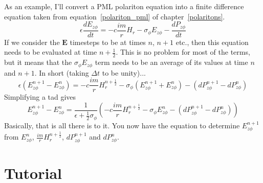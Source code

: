 \documentclass[floats]{book}
\begin{document}
As an example, I'll convert a PML polariton equation into a finite
difference equation taken from equation~\ref{polariton_pml} of
chapter~\ref{polaritons}.
\begin{equation*}
\epsilon\frac{dE_{z\phi}}{dt} = -c \frac{im}r H_r
             - \sigma_\phi E_{z\phi} - \frac{dP_{z\phi}}{dt}
\end{equation*}
If we consider the $\mathbf{E}$ timesteps to be at times $n$, $n+1$ etc.,
then this equation needs to be evaluated at time $n+\frac12$.  This is no
problem for most of the terms, but it means that the $\sigma_\phi
E_{z\phi}$ term needs to be an average of its values at time $n$ and
$n+1$.  In short (taking $\Delta t$ to be unity)...
\begin{equation*}
\epsilon (E_{z\phi}^{n+1} - E_{z\phi}^n) = -c \frac{im}r H_r^{n+\frac12}
  - \sigma_\phi ( E_{z\phi}^{n+1} + E_{z\phi}^n) - (dP_{z\phi}^{n+1} - dP_{z\phi}^n)
\end{equation*}
Simplifying a tad gives
\begin{equation*}
E_{z\phi}^{n+1} - E_{z\phi}^n = \frac1{\epsilon + \frac12\sigma_\phi}
    \left(-c \frac{im}r H_r^{n+\frac12}
  - \sigma_\phi E_{z\phi}^n - (dP_{z\phi}^{n+1} - dP_{z\phi}^n)\right)
\end{equation*}
Basically, that is all there is to it.  You now have the equation to
determine $E_{z\phi}^{n+1}$ from $E_{z\phi}^n$, $\frac{im}r
H_r^{n+\frac12}$, $dP_{z\phi}^{n+1}$ and $dP_{z\phi}^n$.

\chapter{Tutorial}





















\appendix


\end{document}

